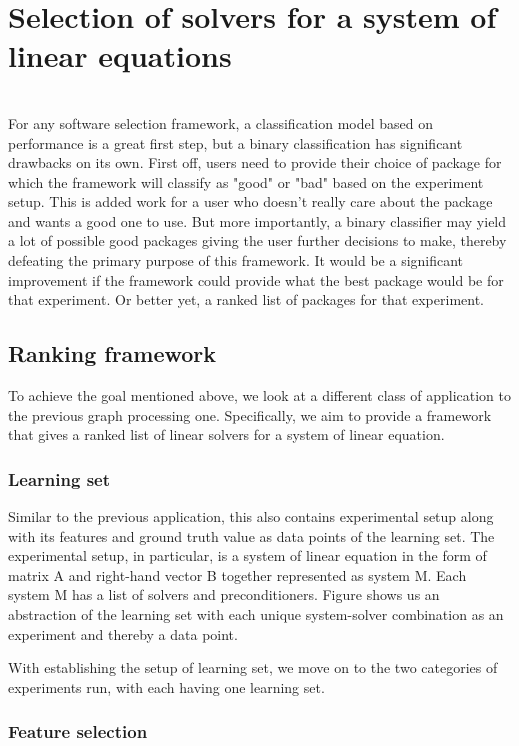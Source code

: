 \section{Selection of solvers for a system of linear equations}
\\For any software selection framework, a classification model based on performance is a great first step, but a binary classification has significant drawbacks on its own. First off, users need to provide their choice of package for which the framework will classify as "good" or "bad" based on the experiment setup. This is added work for a user who doesn't really care about the package and wants a good one to use. But more importantly, a binary classifier may yield a lot of possible good packages giving the user further decisions to make, thereby defeating the primary purpose of this framework. It would be a significant improvement if the framework could provide what the best package would be for that experiment. Or better yet, a ranked list of packages for that experiment.

\subsection{Ranking framework}
To achieve the goal mentioned above, we look at a different class of application to the previous graph processing one. Specifically, we aim to provide a framework that gives a ranked list of linear solvers for a system of linear equation.

\subsubsection{Learning set}
Similar to the previous application, this also contains experimental setup along with its features and ground truth value as data points of the learning set. The experimental setup, in particular, is a system of linear equation in the form of matrix A and right-hand vector B together represented as system M. Each system M has a list of solvers and preconditioners. Figure shows us an abstraction of the learning set with each unique system-solver combination as an experiment and thereby a data point. 

With establishing the setup of learning set, we move on to the two categories of experiments run, with each having one learning set.

\subsubsection{Feature selection}

